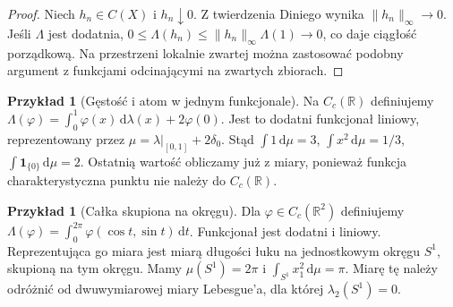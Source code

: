 \documentclass[11pt,a4paper]{article}
\numberwithin{equation}{section}
\theoremstyle{plain}
\theoremstyle{definition}
\newtheorem{przyklad}[twierdzenie]{Przykład}
\theoremstyle{remark}
\newcommand{\R}{\mathbb R}
\newcommand{\ind}[1]{\mathbf 1_{#1}}
\begin{document}
\begin{proof}
Niech $h_n\in C(X)$ i $h_n\downarrow0$. Z twierdzenia Diniego wynika $\|h_n\|_\infty\to0$. Jeśli $\Lambda$ jest dodatnia, $0\le\Lambda(h_n)\le\|h_n\|_\infty\Lambda(1)\to0$, co daje ciągłość porządkową. Na przestrzeni lokalnie zwartej można zastosować podobny argument z funkcjami odcinającymi na zwartych zbiorach.
\end{proof}
\begin{przyklad}[Gęstość i atom w jednym funkcjonale]
Na $C_c(\R)$ definiujemy $\Lambda(\varphi)=\int_0^1\varphi(x)\,\mathrm d\lambda(x)+2\varphi(0)$. Jest to dodatni funkcjonał liniowy, reprezentowany przez $\mu=\lambda|_{[0,1]}+2\delta_0$. Stąd $\int 1\,\mathrm d\mu=3$, $\int x^2\,\mathrm d\mu=1/3$, $\int\ind{\{0\}}\,\mathrm d\mu=2$. Ostatnią wartość obliczamy już z miary, ponieważ funkcja charakterystyczna punktu nie należy do $C_c(\R)$.
\end{przyklad}
\begin{przyklad}[Całka skupiona na okręgu]
Dla $\varphi\in C_c(\R^2)$ definiujemy $\Lambda(\varphi)=\int_0^{2\pi}\varphi(\cos t,\sin t)\,\mathrm dt$. Funkcjonał jest dodatni i liniowy. Reprezentująca go miara jest miarą długości łuku na jednostkowym okręgu $S^1$, skupioną na tym okręgu. Mamy $\mu(S^1)=2\pi$ i $\int_{S^1}x_1^2\,\mathrm d\mu=\pi$. Miarę tę należy odróżnić od dwuwymiarowej miary Lebesgue'a, dla której $\lambda_2(S^1)=0$.
\end{przyklad}

\end{document}
